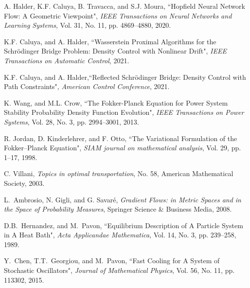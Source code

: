 \documentclass[10pt,twocolumn]{IEEEtran}
\begin{document}
\begin{thebibliography}{99}
A. Halder, K.F. Caluya, B. Travacca, and S.J. Moura, ``Hopfield Neural Network Flow: A Geometric Viewpoint", \emph{IEEE Transactions on Neural Networks and Learning Systems}, Vol. 31, No. 11, pp. 4869--4880, 2020. 


K.F. Caluya, and A. Halder, ``Wasserstein Proximal Algorithms for the Schr\"{o}dinger Bridge Problem: Density Control with Nonlinear Drift", \emph{IEEE Transactions on Automatic Control}, 2021.

K.F. Caluya, and A. Halder,``Reflected Schr\"{o}dinger Bridge: Density Control with Path Constraints", \emph{American Control Conference}, 2021.



K. Wang, and M.L. Crow, ``The Fokker-Planck Equation for Power System Stability Probability Density Function Evolution", \emph{IEEE Transactions on Power Systems}, Vol. 28, No. 3, pp. 2994--3001, 2013.


R. Jordan, D. Kinderlehrer, and F. Otto, ``The Variational Formulation of the Fokker--Planck Equation", \emph{SIAM journal on mathematical analysis}, Vol. 29, pp. 1--17, 1998.

C. Villani, \emph{Topics in optimal transportation}, No. 58, American Mathematical Society, 2003.

L.~Ambrosio, N. Gigli, and G. Savar{\'e}, \emph{Gradient Flows: in Metric Spaces and in the Space of Probability Measures}, Springer Science \& Business Media, 2008.



D.B.~Hernandez, and M.~Pavon, ``Equilibrium Description of A Particle System in A Heat Bath", \emph{Acta Applicandae Mathematica}, Vol. 14, No. 3, pp. 239--258, 1989.

Y.~Chen, T.T.~Georgiou, and M.~Pavon, ``Fast Cooling for A System of Stochastic Oscillators", \emph{Journal of Mathematical Physics}, Vol. 56, No. 11, pp. 113302, 2015.


\end{thebibliography}
\end{document}
